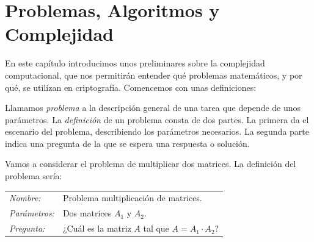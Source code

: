 
\chapter{Problemas, Algoritmos y Complejidad}\label{ch:preliminaresComputacion}







En este capítulo introducimos unos preliminares sobre la complejidad computacional, que nos permitirán entender qué problemas matemáticos, y por qué, se utilizan en criptografía. Comencemos con unas definiciones:

\begin{definition}
	Llamamos \textit{problema} a la descripción general de una tarea que depende de unos parámetros. La \textit{definición} de un problema consta de dos partes. La primera da el escenario del problema, describiendo los parámetros necesarios. La segunda parte indica una pregunta de la que se espera una respuesta o solución.
\end{definition}

\begin{example}
	Vamos a considerar el problema de multiplicar dos matrices. La definición del problema sería:

	\begin{tabular}{|ll}
		\textit{Nombre:} & Problema multiplicación de matrices. \\
		\textit{Parámetros:} & Dos matrices $A_1$ y $A_2$. \\
		\textit{Pregunta:} & ¿Cuál es la matriz $A$ tal que $A=A_1 \cdot A_2$? \\
	\end{tabular}
\end{example}

